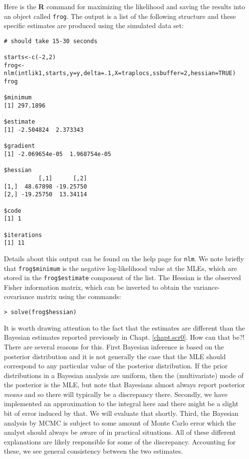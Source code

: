 Here is the {\bf R} command for maximizing the likelihood and saving the
results into an object called \mbox{\tt frog}.  The output is a list of the
following structure and these specific estimates are produced using
the simulated data set:

{\small 
\begin{verbatim}
# should take 15-30 seconds

starts<-c(-2,2)
frog<-nlm(intlik1,starts,y=y,delta=.1,X=traplocs,ssbuffer=2,hessian=TRUE)
frog

$minimum
[1] 297.1896

$estimate
[1] -2.504824  2.373343

$gradient
[1] -2.069654e-05  1.968754e-05

$hessian
          [,1]      [,2]
[1,]  48.67898 -19.25750
[2,] -19.25750  13.34114

$code
[1] 1

$iterations
[1] 11
\end{verbatim}
} 
Details about this output can be found on the help page for
\mbox{\tt nlm}. We note briefly that \mbox{\tt frog\$minimum} is the
negative log-likelihood value at the MLEs, which are stored in the
\mbox{\tt frog\$estimate} component of the list. The Hessian is the
observed Fisher information matrix, which can be inverted to obtain
the variance-covariance matrix using the commands:
\begin{verbatim}
> solve(frog$hessian)
\end{verbatim}

It is worth drawing attention to the fact that the estimates are
different than the Bayesian estimates reported previously in Chapt. \ref{chapt.scr0}.
How can that be?!  There are several reasons for
this.  First Bayesian inference is based on the posterior distribution
and it is not generally the case that the MLE should correspond to any
particular value of the posterior distribution. If the prior
distributions in a Bayesian analysis are uniform, then the
(multivariate) mode of the
posterior is the MLE, but note that Bayesians almost always report
posterior {\it means} and so there will typically be a discrepancy
there. Secondly, we have implemented an approximation to the integral
here and there might be a slight bit of error induced by that. We will
evaluate that shortly. Third, the Bayesian analysis by MCMC is subject
to some amount of Monte Carlo error which the analyst should always be
aware of in practical situations.  All of these different explanations
are likely responsible for some of the discrepancy. Accounting for
these, we see general consistency between the
two estimates.

